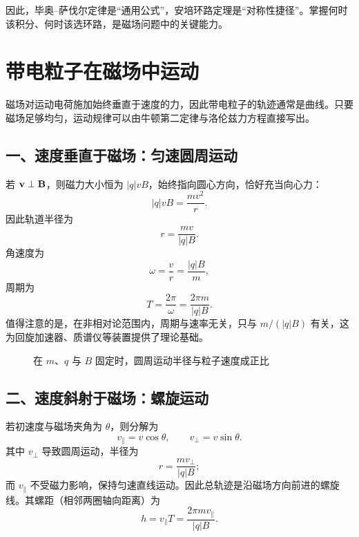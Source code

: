 \begin{remark}
因此，毕奥--萨伐尔定律是“通用公式”，安培环路定理是“对称性捷径”。掌握何时该积分、何时该选环路，是磁场问题中的关键能力。
\end{remark}

\section{带电粒子在磁场中运动}

磁场对运动电荷施加始终垂直于速度的力，因此带电粒子的轨迹通常是曲线。只要磁场足够均匀，运动规律可以由牛顿第二定律与洛伦兹力方程直接写出。

\subsection*{一、速度垂直于磁场：匀速圆周运动}

若 $\vb{v}\perp\vb{B}$，则磁力大小恒为 $|q|vB$，始终指向圆心方向，恰好充当向心力：
\[
  |q|vB=\frac{mv^2}{r}.
\]
因此轨道半径为
\[
  r=\frac{mv}{|q|B}.
\]
角速度为
\[
  \omega=\frac{v}{r}=\frac{|q|B}{m},
\]
周期为
\[
  T=\frac{2\pi}{\omega}=\frac{2\pi m}{|q|B}.
\]
值得注意的是，在非相对论范围内，周期与速率无关，只与 $m/(|q|B)$ 有关，这为回旋加速器、质谱仪等装置提供了理论基础。

\begin{figure}[htbp]
\centering
{}
\caption{在 $m$、$q$ 与 $B$ 固定时，圆周运动半径与粒子速度成正比}
\end{figure}

\subsection*{二、速度斜射于磁场：螺旋运动}

若初速度与磁场夹角为 $\theta$，则分解为
\[
  v_\parallel=v\cos\theta,
  \qquad
  v_\perp=v\sin\theta.
\]
其中 $v_\perp$ 导致圆周运动，半径为
\[
  r=\frac{mv_\perp}{|q|B};
\]
而 $v_\parallel$ 不受磁力影响，保持匀速直线运动。因此总轨迹是沿磁场方向前进的螺旋线。其螺距（相邻两圈轴向距离）为
\[
  h=v_\parallel T=\frac{2\pi m v_\parallel}{|q|B}.
\]

